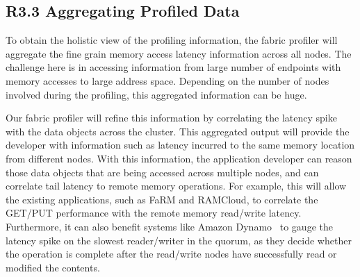 \subsection{R3.3 Aggregating Profiled Data}
\label{sub:agg}

\boxbeg
\begin{Challenge}
  To obtain the holistic view of the profiling information, the fabric
  profiler will aggregate the fine grain memory access latency
  information across all nodes. The challenge here is in accessing
  information from large number of endpoints with memory accesses to
  large address space. Depending on the number of nodes involved
  during the profiling, this aggregated information can be huge.
\end{Challenge}
\boxend

Our fabric profiler will refine this information by correlating the
latency spike with the data objects across the cluster. This
aggregated output will provide the developer with information such as
latency incurred to the same memory location from different
nodes. With this information, the application developer can reason
those data objects that are being accessed across multiple
nodes, and can correlate tail latency to remote memory operations. For
example, this will allow the existing applications, such as FaRM and
RAMCloud, to correlate the GET/PUT performance with the remote memory
read/write latency. Furthermore, it can also benefit systems like
Amazon Dynamo~\cite{amazon:dynamo} to gauge the latency spike on the
slowest reader/writer in the quorum, as they decide whether the
operation is complete after the read/write nodes have successfully
read or modified the contents.

